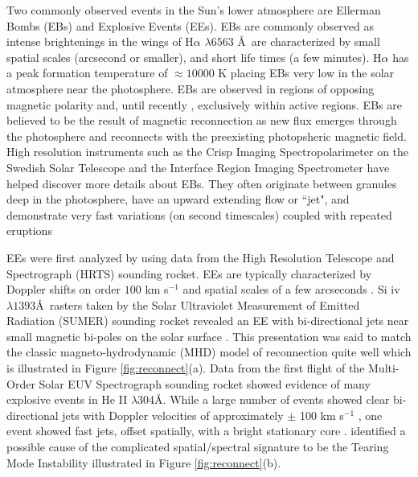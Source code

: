 \documentclass[]{aastex6}
\begin{document}
	Two commonly observed events in the Sun's lower atmosphere are Ellerman Bombs (EBs) and Explosive Events (EEs). EBs \citep{Ellerman1917} are commonly observed as intense brightenings in the wings of H$\alpha$ $\lambda 6563$ \AA \,  are characterized by small spatial scales (arcsecond or smaller), and short life times (a few minutes). H$\alpha$ has a peak formation temperature of $\approx 10000$ K placing EBs very low in the solar atmosphere near the photosphere. EBs are observed in regions of opposing magnetic polarity and, until recently \citep{Nelson2017}, exclusively within active regions.  EBs are believed to be the result of magnetic reconnection as new flux emerges through the photosphere and reconnects with the preexisting photopsheric magnetic field.  High resolution instruments such as the Crisp Imaging Spectropolarimeter \citep[CHRISP;][]{CHRISP} on the Swedish Solar Telescope \citep[SST;][]{SST} and the Interface Region Imaging Spectrometer \citep[IRIS;][]{IRIS} have helped discover more details about EBs.  They often originate between granules deep in the photosphere, have an upward extending flow or ``jet", and demonstrate very fast variations (on second timescales) coupled with repeated eruptions \citep{Watanabe2011,Vissers2013,Vissers2015}
	
	
	EEs were first analyzed by \citet{Brueckner1983} using data from the High Resolution Telescope and Spectrograph (HRTS) sounding rocket. EEs are typically characterized by Doppler shifts on order $100$ km s$^{-1}$ and spatial scales of a few arcseconds \citep{Dere1989,Dere1994}.  Si {\sc iv} $\lambda 1393$\AA\ rasters taken by the Solar Ultraviolet Measurement of Emitted Radiation (SUMER) sounding rocket revealed an EE with bi-directional jets near small magnetic bi-poles on the solar surface \citep{Innes1997}.  This presentation was said to match the classic magneto-hydrodynamic (MHD) model of reconnection \citep{Petschek1964} quite well which is illustrated in Figure \ref{fig:reconnect}(a). Data from the first flight of the Multi-Order Solar EUV Spectrograph \citep[MOSES;][]{Fox2010} sounding rocket showed evidence of many explosive events in He II $\lambda$304\AA. While a large number of events showed clear bi-directional jets with Doppler velocities of approximately $\pm$ 100 km s$^{-1}$ \citep{Rust2017}, one event showed fast jets, offset spatially, with a bright stationary core \citep{Fox2010}.  \citet{Fox2010} identified a possible cause of the complicated spatial/spectral signature to be the Tearing Mode Instability \citep{Furth1963} illustrated in Figure \ref{fig:reconnect}(b).
	
\end{document}
